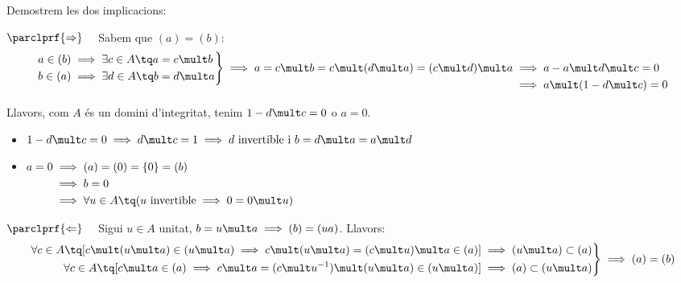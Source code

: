 Demostrem les dos implicacions:\medskip

$\parclprf{\Rightarrow} \quad$ Sabem que $(a) = (b)$:
\[\left.\begin{aligned}
	a \in (b) & \implies \exists c \in A \tq a = c \mult b \\
	b \in (a) & \implies \exists d \in A \tq b = d \mult a
\end{aligned}\right\}
\implies a = c \mult b = c \mult (d \mult a) = (c \mult d) \mult a \begin{aligned}[t]
	& \implies a - a \mult d \mult c = 0 \\
	& \implies a \mult (1 - d \mult c) = 0
\end{aligned}\]

Llavors, com $A$ és un domini d'integritat, tenim $1 - d \mult c = 0$ o  $a = 0$.
\begin{itemize}
	\item $1 - d \mult c = 0 \implies d \mult c = 1 \implies d \text{ invertible i } b = d \mult a = a \mult d$
	\item $\begin{aligned}[t]
		a = 0 	& \implies (a) = (0)= \{0\} = (b) \\
			& \implies b = 0 \\
			& \implies \forall u \in A \tq (u \text{ invertible} \implies 0 = 0 \mult u)
	\end{aligned}$
\end{itemize}

$\parclprf{\Leftarrow} \quad$ Sigui $u \in A$ unitat, $b = u \mult a \implies (b) = (ua)$. Llavors:
\[\left.\begin{aligned}
	\forall c \in A \tq [c \mult (u \mult a) \in (u \mult a) \implies c \mult (u \mult a) = (c \mult u) \mult a \in (a)] & \implies (u \mult a) \subset (a) \\
	\forall c \in A \tq [c \mult a \in (a) \implies c \mult a = (c \mult u^{-1}) \mult (u \mult a) \in (u \mult a)] & \implies (a) \subset (u \mult a)
\end{aligned}\right\} \implies (a) = (b)\]